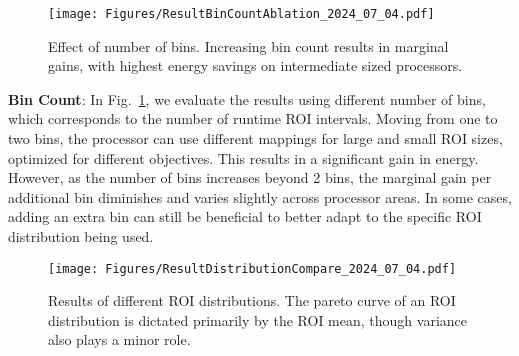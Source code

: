 
\begin{figure}
    \centering
    \texttt{[image: Figures/ResultBinCountAblation\_2024\_07\_04.pdf]}
    \caption{Effect of number of bins. Increasing bin count results in marginal gains, with highest energy savings on intermediate sized processors.}
    \label{fig:result_bincount_ablation}
\end{figure}

\textbf{Bin Count}: In Fig.~\ref{fig:result_bincount_ablation}, we evaluate the results using different number of bins, which corresponds to the number of runtime ROI intervals.
Moving from one to two bins, the processor can use different mappings for large and small ROI sizes, optimized for different objectives.
This results in a significant gain in energy.
However, as the number of bins increases beyond 2 bins, the marginal gain per additional bin diminishes and varies slightly across processor areas.
In some cases, adding an extra bin can still be beneficial to better adapt to the specific ROI distribution being used.

\begin{figure}
    \centering
    \texttt{[image: Figures/ResultDistributionCompare\_2024\_07\_04.pdf]}
    \caption{Results of different ROI distributions. The pareto curve of an ROI distribution is dictated primarily by the ROI mean, though variance also plays a minor role.}
    \label{fig:result_distribution_compare}
\end{figure}

